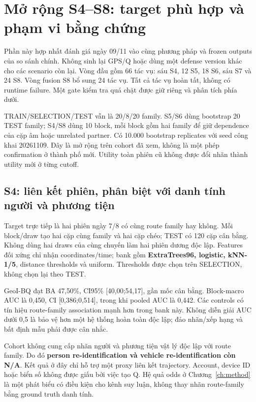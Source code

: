 \section{Mở rộng S4--S8: target phù hợp và phạm vi bằng chứng}\label{sec:extended-scenarios}
Phần này hợp nhất đánh giá ngày 09/11 vào cùng phương pháp và frozen outputs của so sánh chính.
Không sinh lại GPS/Q hoặc dùng một defense version khác cho các scenario còn lại. Vòng đầu gồm
66 tác vụ: sáu S4, 12 S5, 18 S6, sáu S7 và 24 S8. Vòng fusion S8 bổ sung 24 tác vụ. Tất cả tác vụ
hoàn tất, không có runtime failure. Một gate kiểm tra quá chặt được giữ riêng và phân tích phía dưới.

TRAIN/SELECTION/TEST vẫn là 20/8/20 family. S5/S6 dùng bootstrap 20 TEST family; S4/S8 dùng
10 block, mỗi block gồm hai family để giữ dependence của cặp âm hoặc unrelated partner. Có
10.000 bootstrap replicates với seed công khai 20261109. Đây là mở rộng trên cohort đã xem,
không là một phép confirmation ở thành phố mới. Utility toàn phiên cũ không được đổi nhãn thành
utility mới ở từng cutoff.

\subsection{S4: liên kết phiên, phân biệt với danh tính người và phương tiện}
Target trực tiếp là hai phiên ngày 7/8 có cùng route family hay không. Mỗi block/draw tạo hai cặp
cùng family và hai cặp chéo; TEST có 120 cặp cân bằng. Không dùng hai draws của cùng chuyến làm
hai phiên dương độc lập. Features đối xứng chỉ nhận coordinates/time; bank gồm
\textbf{ExtraTrees96, logistic, kNN-1/5}, distance thresholds và uniform. Thresholds được chọn trên
SELECTION, không chọn lại theo TEST.


GeoI-BQ đạt BA 47,50\%, CI95\% [40,00;54,17], gần mốc cân bằng. Block-macro AUC là 0,450,
CI [0,386;0,514], trong khi pooled AUC là 0,442. Các controls có tín hiệu route-family association
mạnh hơn trong bank này. Không diễn giải AUC dưới 0,5 là bảo vệ hơn một hệ thống hoàn toàn độc lập;
đảo nhãn/xếp hạng và bất định mẫu phải được cân nhắc.

Cohort không cung cấp nhãn người và phương tiện vật lý độc lập với route family. Do đó
\textbf{person re-identification và vehicle re-identification còn N/A}. Kết quả ở đây chỉ hỗ trợ
một proxy liên kết trajectory. Account, device ID hoặc biển số không được giấu bởi việc tạo Q.
Hệ quả odds ở Chương~\ref{ch:method} là một phát biểu có điều kiện cho kênh suy luận, không thay
nhãn route-family bằng ground truth danh tính.

